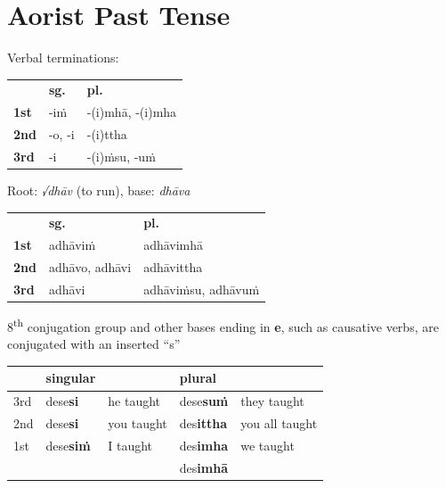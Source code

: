 \documentclass[11pt,oneside]{memoir}
\begin{document}
\clearpage
\section{Aorist Past Tense}
\label{sec:org816a8ea}

{\centering\par
\begin{multicols}{2}

Verbal terminations:

\begin{center}
\begin{tabular}{lll}
 & \textbf{sg.} & \textbf{pl.}\\
\textbf{1st} & -iṁ & -(i)mhā, -(i)mha\\
\textbf{2nd} & -o, -i & -(i)ttha\\
\textbf{3rd} & -i & -(i)ṁsu, -uṁ\\
\end{tabular}
\end{center}

\columnbreak

Root: \emph{√dhāv} (to run), base: \emph{dhāva}

\begin{center}
\begin{tabular}{lll}
 & \textbf{sg.} & \textbf{pl.}\\
\textbf{1st} & adhāviṁ & adhāvimhā\\
\textbf{2nd} & adhāvo, adhāvi & adhāvittha\\
\textbf{3rd} & adhāvi & adhāviṁsu, adhāvuṁ\\
\end{tabular}
\end{center}

\end{multicols}
\par}

8\textsuperscript{th} conjugation group and other bases ending in \textbf{e}, such as causative verbs, are conjugated with an inserted “s”

\begin{center}
\begin{tabular}{lllll}
 & singular &  & plural & \\
\hline
3rd & dese\textbf{si} & he taught & dese\textbf{suṁ} & they taught\\
2nd & dese\textbf{si} & you taught & des\textbf{ittha} & you all taught\\
1st & dese\textbf{siṁ} & I taught & des\textbf{imha} & we taught\\
 &  &  & des\textbf{imhā} & \\
\end{tabular}
\end{center}
\end{document}
